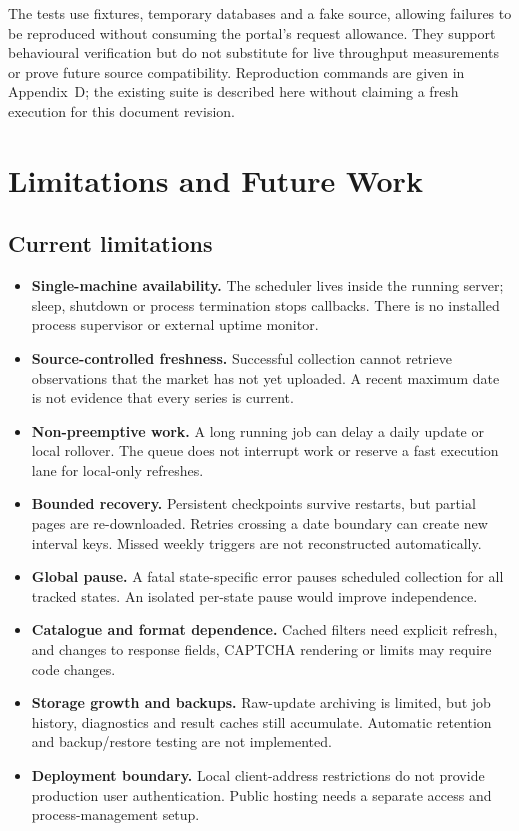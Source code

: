 \documentclass[12pt,a4paper,oneside]{report}
\numberwithin{equation}{chapter}
\numberwithin{figure}{chapter}
\numberwithin{table}{chapter}
\theoremstyle{definition}
\begin{document}
The tests use fixtures, temporary databases and a fake source, allowing failures to be reproduced without consuming the portal's request allowance. They support behavioural verification but do not substitute for live throughput measurements or prove future source compatibility. Reproduction commands are given in Appendix~D; the existing suite is described here without claiming a fresh execution for this document revision.

\chapter{Limitations and Future Work}

\section{Current limitations}
\begin{itemize}
  \item \textbf{Single-machine availability.} The scheduler lives inside the running server; sleep, shutdown or process termination stops callbacks. There is no installed process supervisor or external uptime monitor.
  \item \textbf{Source-controlled freshness.} Successful collection cannot retrieve observations that the market has not yet uploaded. A recent maximum date is not evidence that every series is current.
  \item \textbf{Non-preemptive work.} A long running job can delay a daily update or local rollover. The queue does not interrupt work or reserve a fast execution lane for local-only refreshes.
  \item \textbf{Bounded recovery.} Persistent checkpoints survive restarts, but partial pages are re-downloaded. Retries crossing a date boundary can create new interval keys. Missed weekly triggers are not reconstructed automatically.
  \item \textbf{Global pause.} A fatal state-specific error pauses scheduled collection for all tracked states. An isolated per-state pause would improve independence.
  \item \textbf{Catalogue and format dependence.} Cached filters need explicit refresh, and changes to response fields, CAPTCHA rendering or limits may require code changes.
  \item \textbf{Storage growth and backups.} Raw-update archiving is limited, but job history, diagnostics and result caches still accumulate. Automatic retention and backup/restore testing are not implemented.
  \item \textbf{Deployment boundary.} Local client-address restrictions do not provide production user authentication. Public hosting needs a separate access and process-management setup.
\end{itemize}
\end{document}
